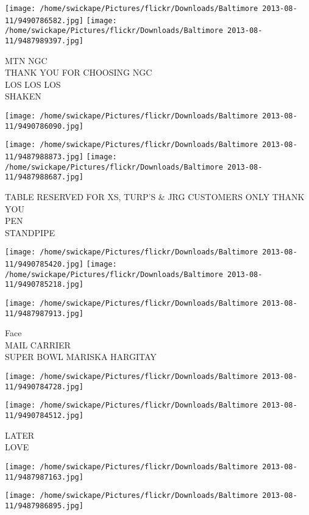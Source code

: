 \documentclass[10pt,letterpaper]{article}
\begin{document}
\texttt{[image: /home/swickape/Pictures/flickr/Downloads/Baltimore 2013-08-11/9490786582.jpg]}
\texttt{[image: /home/swickape/Pictures/flickr/Downloads/Baltimore 2013-08-11/9487989397.jpg]}

MTN NGC\\
THANK YOU FOR CHOOSING NGC\\
LOS LOS LOS\\
SHAKEN
\pagebreak

\texttt{[image: /home/swickape/Pictures/flickr/Downloads/Baltimore 2013-08-11/9490786090.jpg]}

\vspace{0.25in}
\texttt{[image: /home/swickape/Pictures/flickr/Downloads/Baltimore 2013-08-11/9487988873.jpg]}
\texttt{[image: /home/swickape/Pictures/flickr/Downloads/Baltimore 2013-08-11/9487988687.jpg]}

TABLE RESERVED FOR XS, TURP'S \& JRG CUSTOMERS ONLY THANK YOU\\
PEN\\
STANDPIPE
\pagebreak

\texttt{[image: /home/swickape/Pictures/flickr/Downloads/Baltimore 2013-08-11/9490785420.jpg]}
\texttt{[image: /home/swickape/Pictures/flickr/Downloads/Baltimore 2013-08-11/9490785218.jpg]}

\texttt{[image: /home/swickape/Pictures/flickr/Downloads/Baltimore 2013-08-11/9487987913.jpg]}

Face\\
MAIL CARRIER\\
SUPER BOWL MARISKA HARGITAY
\pagebreak

\texttt{[image: /home/swickape/Pictures/flickr/Downloads/Baltimore 2013-08-11/9490784728.jpg]}

\vspace{0.25in}
\texttt{[image: /home/swickape/Pictures/flickr/Downloads/Baltimore 2013-08-11/9490784512.jpg]}

LATER\\
LOVE
\pagebreak

\texttt{[image: /home/swickape/Pictures/flickr/Downloads/Baltimore 2013-08-11/9487987163.jpg]}

\vspace{0.25in}
\texttt{[image: /home/swickape/Pictures/flickr/Downloads/Baltimore 2013-08-11/9487986895.jpg]}
\end{document}
